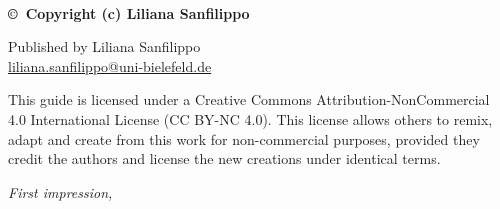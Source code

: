 \pagecolor{pagecolor}
~\vfill
\thispagestyle{empty}
\setlength{\parindent}{0pt}
\setlength{\parskip}{\baselineskip}


\textbf{\copyright\ Copyright (c) Liliana Sanfilippo \the\year\ }


\small{Published by Liliana Sanfilippo}\\
\small{\href{mailto:liliana.sanfilippo@uni-bielefeld.de}{liliana.sanfilippo@uni-bielefeld.de}}




\begin{flushright}
	This guide is licensed under a Creative Commons Attribution-NonCommercial 4.0 International License (CC BY-NC 4.0). This license allows others to remix, adapt and create from this work for non-commercial purposes, provided they credit the authors and license the new creations under identical terms.
\end{flushright}

\par\textit{First impression, \monthyear}

\setlength{\parindent}{\indentacaopar}

\restoregeometry
\nopagecolor
